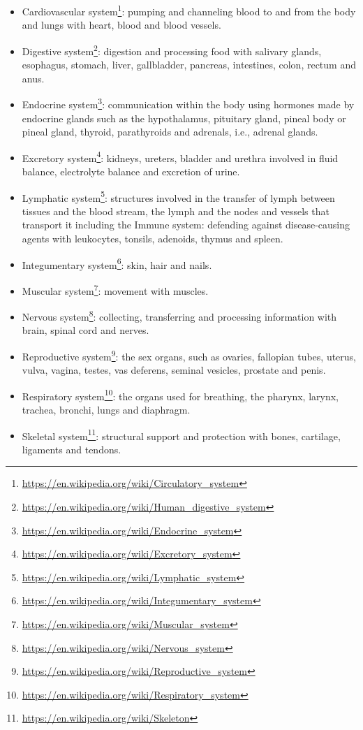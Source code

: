 \documentclass[]{book}
\providecommand{\tightlist}{%
  \setlength{\itemsep}{0pt}\setlength{\parskip}{0pt}}
\let\rmarkdownfootnote\footnote%
\def\footnote{\protect\rmarkdownfootnote}
\renewcommand{\href}[2]{#2\footnote{\url{#1}}}
\theoremstyle{definition}
\theoremstyle{definition}
\theoremstyle{definition}
\theoremstyle{remark}
\begin{document}
\begin{itemize}
\tightlist
\item
  \href{https://en.wikipedia.org/wiki/Circulatory_system}{Cardiovascular
  system}: pumping and channeling blood to and from the body and lungs
  with heart, blood and blood vessels.
\item
  \href{https://en.wikipedia.org/wiki/Human_digestive_system}{Digestive
  system}: digestion and processing food with salivary glands,
  esophagus, stomach, liver, gallbladder, pancreas, intestines, colon,
  rectum and anus.
\item
  \href{https://en.wikipedia.org/wiki/Endocrine_system}{Endocrine
  system}: communication within the body using hormones made by
  endocrine glands such as the hypothalamus, pituitary gland, pineal
  body or pineal gland, thyroid, parathyroids and adrenals, i.e.,
  adrenal glands.
\item
  \href{https://en.wikipedia.org/wiki/Excretory_system}{Excretory
  system}: kidneys, ureters, bladder and urethra involved in fluid
  balance, electrolyte balance and excretion of urine.
\item
  \href{https://en.wikipedia.org/wiki/Lymphatic_system}{Lymphatic
  system}: structures involved in the transfer of lymph between tissues
  and the blood stream, the lymph and the nodes and vessels that
  transport it including the Immune system: defending against
  disease-causing agents with leukocytes, tonsils, adenoids, thymus and
  spleen.
\item
  \href{https://en.wikipedia.org/wiki/Integumentary_system}{Integumentary
  system}: skin, hair and nails.
\item
  \href{https://en.wikipedia.org/wiki/Muscular_system}{Muscular system}:
  movement with muscles.
\item
  \href{https://en.wikipedia.org/wiki/Nervous_system}{Nervous system}:
  collecting, transferring and processing information with brain, spinal
  cord and nerves.
\item
  \href{https://en.wikipedia.org/wiki/Reproductive_system}{Reproductive
  system}: the sex organs, such as ovaries, fallopian tubes, uterus,
  vulva, vagina, testes, vas deferens, seminal vesicles, prostate and
  penis.
\item
  \href{https://en.wikipedia.org/wiki/Respiratory_system}{Respiratory
  system}: the organs used for breathing, the pharynx, larynx, trachea,
  bronchi, lungs and diaphragm.
\item
  \href{https://en.wikipedia.org/wiki/Skeleton}{Skeletal system}:
  structural support and protection with bones, cartilage, ligaments and
  tendons.
\end{itemize}
\end{document}
